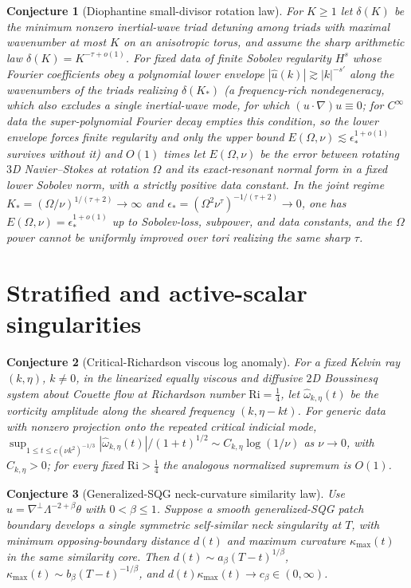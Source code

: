 \documentclass[11pt]{article}
\newtheorem{conjecture}{Conjecture}
\theoremstyle{definition}
\begin{document}
\begin{conjecture}[Diophantine small-divisor rotation law]\label{al10}
For $K\ge1$ let $\delta(K)$ be the minimum nonzero inertial-wave triad detuning among triads with maximal wavenumber at most $K$ on an anisotropic torus, and assume the sharp arithmetic law $\delta(K)=K^{-\tau+o(1)}$.  For fixed data of finite Sobolev regularity $H^s$ whose Fourier coefficients obey a polynomial lower envelope $|\hat u(k)|\gtrsim|k|^{-s'}$ along the wavenumbers of the triads realizing $\delta(K_\ast)$ (a frequency-rich nondegeneracy, which also excludes a single inertial-wave mode, for which $(u\cdot\nabla)u\equiv0$; for $C^\infty$ data the super-polynomial Fourier decay empties this condition, so the lower envelope forces finite regularity and only the upper bound $E(\Omega,\nu)\lesssim\epsilon_\ast^{1+o(1)}$ survives without it) and $O(1)$ times let $E(\Omega,\nu)$ be the error between rotating $3$D Navier--Stokes at rotation $\Omega$ and its exact-resonant normal form in a fixed lower Sobolev norm, with a strictly positive data constant.  In the joint regime $K_\ast=(\Omega/\nu)^{1/(\tau+2)}\to\infty$ and $\epsilon_\ast=(\Omega^2\nu^\tau)^{-1/(\tau+2)}\to0$, one has $E(\Omega,\nu)=\epsilon_\ast^{1+o(1)}$ up to Sobolev-loss, subpower, and data constants, and the $\Omega$ power cannot be uniformly improved over tori realizing the same sharp $\tau$.
\end{conjecture}

\section{Stratified and active-scalar singularities}

\begin{conjecture}[Critical-Richardson viscous log anomaly]\label{al11}
For a fixed Kelvin ray $(k,\eta)$, $k\ne0$, in the linearized equally viscous and diffusive $2$D Boussinesq system about Couette flow at Richardson number $\mathrm{Ri}=\tfrac14$, let $\hat\omega_{k,\eta}(t)$ be the vorticity amplitude along the sheared frequency $(k,\eta-kt)$.  For generic data with nonzero projection onto the repeated critical indicial mode, $\sup_{1\le t\le c(\nu k^2)^{-1/3}}|\hat\omega_{k,\eta}(t)|/(1+t)^{1/2}\sim C_{k,\eta}\log(1/\nu)$ as $\nu\to0$, with $C_{k,\eta}>0$; for every fixed $\mathrm{Ri}>\tfrac14$ the analogous normalized supremum is $O(1)$.
\end{conjecture}

\begin{conjecture}[Generalized-SQG neck-curvature similarity law]\label{al12}
Use $u=\nabla^\perp\Lambda^{-2+\beta}\theta$ with $0<\beta\le1$.  Suppose a smooth generalized-SQG patch boundary develops a single symmetric self-similar neck singularity at $T$, with minimum opposing-boundary distance $d(t)$ and maximum curvature $\kappa_{\max}(t)$ in the same similarity core.  Then $d(t)\sim a_\beta(T-t)^{1/\beta}$, $\kappa_{\max}(t)\sim b_\beta(T-t)^{-1/\beta}$, and $d(t)\kappa_{\max}(t)\to c_\beta\in(0,\infty)$.
\end{conjecture}
\end{document}
